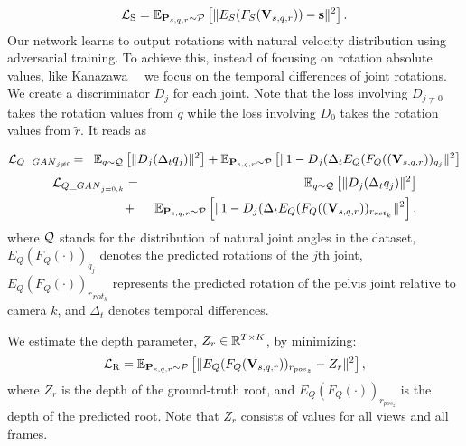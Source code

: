\begin{align}
\mathcal{L}_{\text{S}} = 
\mathbb{E}_{{\bf P}_{s,q,r} \sim \mathcal{P}} 
\left[ \Vert E_S(F_S({\bf V}_{s,q,r}))-{\bf s}\Vert^2 \right].
\end{align}
Our network learns to output rotations with natural velocity distribution using adversarial training. To achieve this, instead of focusing on rotation absolute values, like Kanazawa~\etal~ we focus on the temporal differences of joint rotations. We create a discriminator $D_j$ for each joint. 
Note that the loss involving $D_{j\neq 0}$ takes the rotation values from $\tilde{q}$ while the loss involving $D_0$ takes the rotation values from $\tilde{r}$. It reads as
\setlength{\abovedisplayskip}{-5pt plus 2pt minus 2pt}
\setlength{\belowdisplayskip}{-5pt plus 2pt minus 2pt}

\begin{eqnarray*}
\mathcal{L}_{Q\_{GAN}_{j\ne 0}} \! & = \!&\mathbb{E}_{q \sim \mathcal{Q}}
\left[ \Vert D_j(\Delta_t q_j) \Vert^2 \right]+ \mathbb{E}_{{\bf P}_{s,q,r}\sim \mathcal{P}} \left[ \Vert 1-D_j(\Delta_t E_Q(F_Q(({\bf V}_{s,q,r}))_{q_j}\Vert^2\right]
\end{eqnarray*}
%
\ifeccv
    \setlength{\abovedisplayskip}{0pt plus 2pt minus 2pt}
    \setlength{\belowdisplayskip}{5pt plus 2pt minus 2pt}
\fi
\begin{eqnarray}
\Loss_{{Q\_{GAN}}_{j= 0, k}} & =  &\ \bbe_{q \sim \qq}
\left[ \Vert D_j(\Delta_t q_j) \Vert^2 \right] \\ 
\nonumber
 &  + & %
 \ \bbe_{\bP_{s,q,r}\sim \pp} 
 \left[ \Vert 1-D_j(\Delta_t E_Q(F_Q((\bV_{s,q,r}))_{r_{{rot}_k}}\Vert^2\right],
\end{eqnarray}
where $\mathcal{Q}$ stands for the distribution of natural joint angles in the dataset, $E_Q(F_Q(\cdot))_{q_j}$ denotes the predicted rotations of the $j$th joint, ${{E_Q(F_Q(\cdot))_r}_{rot_k}}$ represents the predicted rotation of the pelvis joint relative to camera $k$, and $\Delta_t$ denotes temporal differences. 

We estimate the depth parameter, $Z_r\in\mathbb{R}^{T\times K}$, by minimizing:
\ifeccv
    \setlength{\abovedisplayskip}{0pt plus 2pt minus 2pt}
    \setlength{\belowdisplayskip}{7pt plus 2pt minus 2pt}
\fi
\begin{align}
\mathcal{L}_{\text{R}} = \mathbb{E}_{{\bf P}_{s,q,r}\sim \mathcal{P}}\left[ \Vert E_Q(F_Q({\bf V}_{s,q,r}))_{r_{pos_z}} - Z_r\Vert^2 \right],
\end{align}
where $Z_r$ is the depth of the ground-truth root, and  $E_Q(F_Q(\cdot))_{r_{pos_z}}$ is the depth of the predicted root. Note that $Z_r$ consists of values for all views and all frames.

